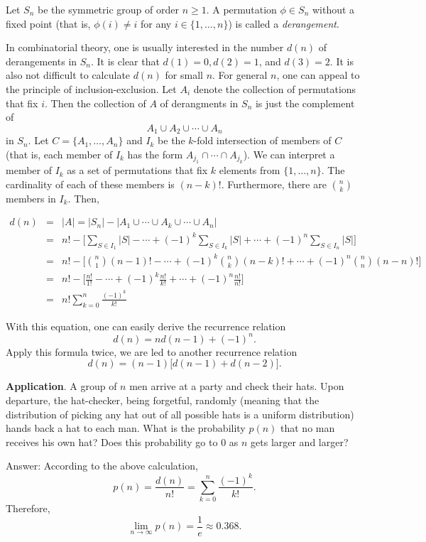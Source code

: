 \documentclass[12pt]{article}
\begin{document}
Let $S_n$ be the symmetric group of order $n\ge 1$.  A permutation $\phi\in S_n$ without a fixed point (that is, $\phi(i)\neq i$ for any $i\in\lbrace 1,\ldots, n\rbrace$) is called a \emph{derangement}.  

In combinatorial theory, one is usually interested in the number $d(n)$ of derangements in $S_n$.  It is clear that $d(1)=0,d(2)=1$, and $d(3)=2$.  It is also not difficult to calculate $d(n)$ for small $n$.  For general $n$, one can appeal to the principle of inclusion-exclusion.  Let $A_i$ denote the collection of permutations that fix $i$.  Then the collection of $A$ of derangments in $S_n$ is just the complement of $$A_1\cup A_2\cup \cdots \cup A_n$$
in $S_n$.  Let $C=\lbrace A_1,\ldots,A_n\rbrace$ and $I_k$ be the $k$-fold intersection of members of $C$ (that is, each member of $I_k$ has the form $A_{j_1}\cap \cdots \cap A_{j_k}$).  We can interpret a member of $I_k$ as a set of permutations that fix $k$ elements from $\lbrace 1,\dots, n\rbrace$.  The cardinality of each of these members is $(n-k)!$.  Furthermore, there are $n\choose k$ members in $I_k$.  Then,

\begin{eqnarray*}
d(n)&=& |A| = |S_n|-|A_1\cup \cdots \cup A_k\cup\cdots \cup A_n| \\
&=& n!-\Big[\sum_{S\in I_1}|S|-\cdots+(-1)^k\sum_{S\in I_k}|S|+\cdots+(-1)^n\sum_{S\in I_n}|S|\Big] \\
&=& n!-\Big[{n\choose 1}(n-1)!-\cdots+(-1)^k {n\choose k} (n-k)!+\cdots+(-1)^n {n\choose n} (n-n)!\Big] \\
&=& n!-\Big[ \frac{n!}{1!}-\cdots +(-1)^k\frac{n!}{k!}+\cdots  +(-1)^n\frac{n!}{n!}\Big] \\
&=& n!\sum_{k=0}^{n}\frac{(-1)^k}{k!}
\end{eqnarray*}

With this equation, one can easily derive the recurrence relation
$$d(n)=nd(n-1)+(-1)^n.$$
Apply this formula twice, we are led to another recurrence relation
$$d(n)=(n-1)\big[d(n-1)+d(n-2)\big].$$

\textbf{Application}.  A group of $n$ men arrive at a party and check their hats.  Upon departure, the hat-checker, being forgetful, randomly (meaning that the distribution of picking any hat out of all possible hats is a uniform distribution) hands back a hat to each man.  What is the probability $p(n)$ that no man receives his own hat?  Does this probability go to $0$ as $n$ gets larger and larger?

Answer: According to the above calculation, $$p(n)=\frac{d(n)}{n!}=\sum_{k=0}^{n}\frac{(-1)^k}{k!}.$$  Therefore, $$\lim_{n\to\infty}p(n)=\frac{1}{e}\approx 0.368.$$
\end{document}
